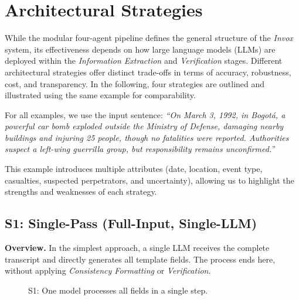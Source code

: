 \section{Architectural Strategies}
\label{sec:concept-strategies}

While the modular four-agent pipeline defines the general structure of the \textit{Invox} system, its effectiveness depends on how large language models (LLMs) are deployed within the \textit{Information Extraction} and \textit{Verification} stages. Different architectural strategies offer distinct trade-offs in terms of accuracy, robustness, cost, and transparency. In the following, four strategies are outlined and illustrated using the same example for comparability.

For all examples, we use the input sentence:  
\textit{``On March 3, 1992, in Bogotá, a powerful car bomb exploded outside the Ministry of Defense, damaging nearby buildings and injuring 25 people, though no fatalities were reported. Authorities suspect a left-wing guerrilla group, but responsibility remains unconfirmed.''}

This example introduces multiple attributes (date, location, event type, casualties, suspected perpetrators, and uncertainty), allowing us to highlight the strengths and weaknesses of each strategy.

\subsection*{S1: Single-Pass (Full-Input, Single-LLM)}

\textbf{Overview.}  
In the simplest approach, a single LLM receives the complete transcript and directly generates all template fields. The process ends here, without applying \textit{Consistency Formatting} or \textit{Verification}.

\begin{figure}[H]
\centering
{}
\caption{S1: One model processes all fields in a single step.}
\label{fig:s1-overview}
\end{figure}

